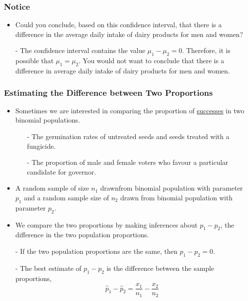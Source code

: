 \documentclass[12pt, letterpaper]{article}
\begin{document}
                \subsubsection*{Notice}
                \begin{itemize}
                    \item Could you conclude, based on this confidence interval, that there is a difference in the average daily intake of dairy products for men and women?
                    \item[-] The confidence interval contains the value $\mu_1 - \mu_2 = 0$. Therefore, it is possible that $\mu_1 = \mu_2$. You would not want to conclude that there is a difference in average daily intake of dairy products for men and women. 
                \end{itemize}
            \subsubsection{Estimating the Difference between Two Proportions}
                \begin{itemize}
                    \item Sometimes we are interested in comparing the proportion of \underline{successes} in two binomial populations.
                    \begin{itemize}
                        \item[-] The germination rates of untreated seeds and seeds treated with a fungicide.
                        \item[-] The proportion of male and female voters who favour a particular candidate for governor.
                    \end{itemize}
                    \item A random sample of size $n_1$ drawnfrom binomial population with parameter $p_1$ and a random sample size of $n_2$ drawn from binomial population with parameter $p_2$.
                    \item We compare the two proportions by making inferences about $p_1 - p_2$, the difference in the two population proportions.
                    \item[-] If the two population proportions are the same, then $p_1 - p_2 = 0$.
                    \item[-] The best estimate of $p_1 - p_2$ is the difference between the sample proportions, $$\hat{p}_1 - \hat{p}_2 = \frac{x_1}{n_1} - \frac{x_2}{n_2}$$
                \end{itemize}
\end{document}
